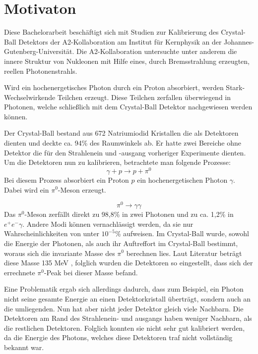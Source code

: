 \documentclass[a4paper,11pt,oneside,final,german,openbib,pdftex]{scrbook}
\begin{document}
\section{Motivaton}
{
	Diese Bachelorarbeit beschäftigt sich mit Studien zur Kalibrierung des Crystal-Ball Detektors der A2-Kollaboration am Institut für Kernphysik an der Johannes-Gutenberg-Universität.
	Die A2-Kollaboration untersuchte unter anderem die innere Struktur von Nukleonen mit Hilfe eines, durch Bremsstrahlung erzeugten, reellen Photonenstrahls. 
	
	Wird ein hochenergetisches Photon durch ein Proton absorbiert, werden Stark-Wechselwirkende Teilchen erzeugt. Diese Teilchen zerfallen überwiegend in Photonen, welche schließlich mit dem Crystal-Ball Detektor nachgewiesen werden können. 
	
	Der Crystal-Ball bestand aus 672 Natriumiodid Kristallen die als Detektoren dienten und deckte ca. 94\% des Raumwinkels ab.
	Er hatte zwei Bereiche ohne Detektor die für den Strahlenein und -ausgang vorheriger Experimente dienten.
	Um die Detektoren nun zu kalibrieren, betrachtete man folgende Prozesse:
\begin{equation}
	\gamma + p \rightarrow p + \pi^0
	\label{eq.gammascattering}
\end{equation} 
Bei diesem Prozess absorbiert ein Proton $p$ ein hochenergetischen Photon $\gamma$. Dabei wird ein $\pi^0$-Meson erzeugt.

	\begin{equation}
		\pi^0\rightarrow \gamma \gamma
		\label{eq.pi0decay}
	\end{equation}
Das $\pi^0$-Meson zerfällt direkt zu 98,8\% in zwei Photonen und zu ca. 1,2\% in $e^+e^- \gamma$. Andere Modi können vernachlässigt werden, da sie nur Wahrscheinlichkeiten von unter $10^{-5}$\% aufweisen. Im Crystal-Ball wurde, sowohl die Energie der Photonen, als auch ihr Auftreffort im Crystal-Ball bestimmt, woraus sich die invariante Masse des $\pi^0$ berechnen lies.
Laut Literatur betr\"agt diese Masse 135 MeV \cite{PDG16}, folglich wurden die Detektoren so eingestellt, dass sich der errechnete $\pi^0$-Peak bei dieser Masse befand. 
		
Eine Problematik ergab sich allerdings dadurch, dass zum Beispiel, ein Photon nicht seine gesamte Energie an einen Detektorkristall überträgt, sondern auch an die umliegenden. Nun hat aber nicht jeder Detektor gleich viele Nachbarn. Die Detektoren am Rand des Strahlenein- und ausgangs haben weniger Nachbarn, als die restlichen Detektoren. Folglich konnten sie nicht sehr gut kalibriert werden, da die Energie des Photons, welches diese Detektoren traf nicht vollständig bekannt war.
	
}
\end{document}
